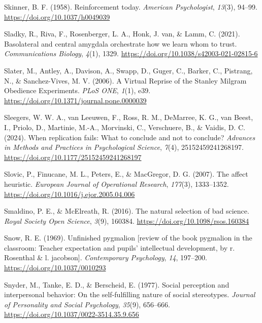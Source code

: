 \documentclass[
  letterpaper,
]{book}
\newlength{\cslhangindent}
\newenvironment{CSLReferences}[2] %
 {\begin{list}{}{%
  \setlength{\itemindent}{0pt}
  \setlength{\leftmargin}{0pt}
  \setlength{\parsep}{0pt}
  \ifodd #1
   \setlength{\leftmargin}{\cslhangindent}
   \setlength{\itemindent}{-1\cslhangindent}
  \fi
  \setlength{\itemsep}{#2\baselineskip}}}
 {\end{list}}
\begin{document}
\begin{CSLReferences}{1}{0}
Skinner, B. F. (1958). {Reinforcement today}. \emph{{American
Psychologist}}, \emph{13}(3), 94--99.
\url{https://doi.org/10.1037/h0049039}

Sladky, R., Riva, F., Rosenberger, L. A., Honk, J. van, \& Lamm, C.
(2021). Basolateral and central amygdala orchestrate how we learn whom
to trust. \emph{Communications Biology}, \emph{4}(1), 1329.
\url{https://doi.org/10.1038/s42003-021-02815-6}

Slater, M., Antley, A., Davison, A., Swapp, D., Guger, C., Barker, C.,
Pistrang, N., \& Sanchez-Vives, M. V. (2006). A {Virtual} {Reprise} of
the {Stanley} {Milgram} {Obedience} {Experiments}. \emph{PLoS ONE},
\emph{1}(1), e39. \url{https://doi.org/10.1371/journal.pone.0000039}

Sleegers, W. W. A., van Leeuwen, F., Ross, R. M., DeMarree, K. G., van
Beest, I., Priolo, D., Martinie, M.-A., Morvinski, C., Verschuere, B.,
\& Vaidis, D. C. (2024). When replication fails: What to conclude and
not to conclude? \emph{Advances in Methods and Practices in
Psychological Science}, \emph{7}(4), 25152459241268197.
\url{https://doi.org/10.1177/25152459241268197}

Slovic, P., Finucane, M. L., Peters, E., \& MacGregor, D. G. (2007). The
affect heuristic. \emph{European Journal of Operational Research},
\emph{177}(3), 1333--1352.
\url{https://doi.org/10.1016/j.ejor.2005.04.006}

Smaldino, P. E., \& McElreath, R. (2016). The natural selection of bad
science. \emph{Royal Society Open Science}, \emph{3}(9), 160384.
\url{https://doi.org/10.1098/rsos.160384}

Snow, R. E. (1969). Unfinished pygmalion {[}review of the book pygmalion
in the classroom: Teacher expectation and pupils' intellectual
development, by r. Rosenthal \& l. jacobson{]}. \emph{Contemporary
Psychology}, \emph{14}, 197--200. \url{https://doi.org/10.1037/0010293}

Snyder, M., Tanke, E. D., \& Berscheid, E. (1977). Social perception and
interpersonal behavior: {On} the self-fulfilling nature of social
stereotypes. \emph{Journal of Personality and Social Psychology},
\emph{35}(9), 656--666. \url{https://doi.org/10.1037/0022-3514.35.9.656}


\end{CSLReferences}
\end{document}
